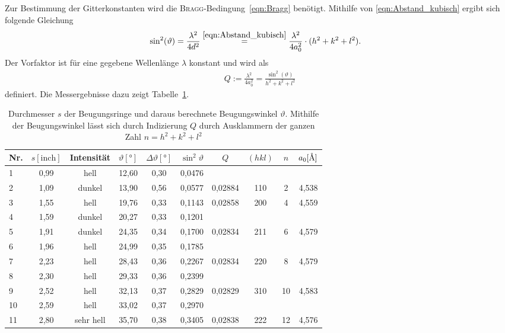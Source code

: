 \documentclass[a4paper,twoside,final]{article}
\begin{document}
Zur Bestimmung der Gitterkonstanten wird die \textsc{Bragg}-Bedingung~\eqref{eqn:Bragg} benötigt. Mithilfe von \eqref{eqn:Abstand_kubisch} ergibt sich folgende Gleichung
\begin{align}
  \sin^2(\vartheta) &= \frac{\lambda^2}{4d^2} \overset{\eqref{eqn:Abstand_kubisch}}{=} \frac{\lambda^2}{4 a_0^2}\cdot (h^2+k^2+l^2).
\end{align}
Der Vorfaktor ist für eine gegebene Wellenlänge $\lambda$ konstant und wird als
\begin{align}
  Q :=\frac{\lambda^2}{4 a_0^2} = \frac{\sin^2(\vartheta)}{h^2 + k^2+l^2}\label{eqn:Q_Parameter}
\end{align} definiert. Die Messergebnisse dazu zeigt Tabelle~\ref{tab:Q_Paramter}.
\begin{table}[ht]
	\centering
	\caption{Durchmesser $s$ der Beugungsringe und daraus berechnete Beugungswinkel $\vartheta$. Mithilfe der Beugungswinkel lässt sich durch Indizierung $Q$ durch Ausklammern der ganzen Zahl $n = h^2 +k^2 +l^2$}
	\label{tab:Q_Paramter}
	\begin{tabular}{l c c c c c | c c c c}
		\toprule
      Nr. & $s [\text{inch}]$ & Intensität & $\vartheta [\si{\degree}]$ & $\Delta \vartheta [\si{\degree}]$ & $\sin^2 \vartheta $ & $Q$ & $(hkl)$ & $n$ & $a_0 [\si{\textup{\AA}}]$\\
    \midrule
1  & 0,99 & hell      & 12,60 & 0,30 & 0,0476 &         &     &    &       \\
2  & 1,09 & dunkel    & 13,90 & 0,56 & 0,0577 & 0,02884 & 110 & 2  & 4,538 \\
3  & 1,55 & hell      & 19,76 & 0,33 & 0,1143 & 0,02858 & 200 & 4  & 4,559 \\
4  & 1,59 & dunkel    & 20,27 & 0,33 & 0,1201 &         &     &    &       \\
5  & 1,91 & dunkel    & 24,35 & 0,34 & 0,1700 & 0,02834 & 211 & 6  & 4,579 \\
6  & 1,96 & hell      & 24,99 & 0,35 & 0,1785 &         &     &    &       \\
7  & 2,23 & hell      & 28,43 & 0,36 & 0,2267 & 0,02834 & 220 & 8  & 4,579 \\
8  & 2,30 & hell      & 29,33 & 0,36 & 0,2399 &         &     &    &       \\
9  & 2,52 & hell      & 32,13 & 0,37 & 0,2829 & 0,02829 & 310 & 10 & 4,583 \\
10 & 2,59 & hell      & 33,02 & 0,37 & 0,2970 &         &     &    &       \\
11 & 2,80 & sehr hell & 35,70 & 0,38 & 0,3405 & 0,02838 & 222 & 12 & 4,576 \\

\end{tabular}
\end{table}
\end{document}
